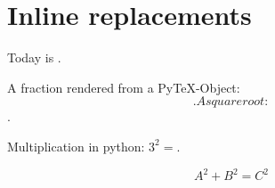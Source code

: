 \documentclass{article}
\begin{document}
\section{Inline replacements}

Today is .

A fraction rendered from a PyTeX-Object: $\iffalse{pytex(Frac("1", "2"))}\fi$.

A square root: $\iffalse{pytex(Sqrt("x", n="3"))}\fi$.

Multiplication in python: $3 ^ 2 = \iffalse{pytex(3 ** 2)}\fi$.

\[
    A ^ 2 + B ^ 2 = C ^ 2
\]
\end{document}
